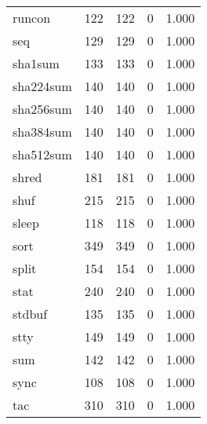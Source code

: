 \begin{longtable}{lp{4.5cm}p{4.5cm}p{4.5cm}p{4.5cm}}
runcon    &                     122 &              122 &                 0 &                        1.000 \\
seq       &                     129 &              129 &                 0 &                        1.000 \\
sha1sum   &                     133 &              133 &                 0 &                        1.000 \\
sha224sum &                     140 &              140 &                 0 &                        1.000 \\
sha256sum &                     140 &              140 &                 0 &                        1.000 \\
sha384sum &                     140 &              140 &                 0 &                        1.000 \\
sha512sum &                     140 &              140 &                 0 &                        1.000 \\
shred     &                     181 &              181 &                 0 &                        1.000 \\
shuf      &                     215 &              215 &                 0 &                        1.000 \\
sleep     &                     118 &              118 &                 0 &                        1.000 \\
sort      &                     349 &              349 &                 0 &                        1.000 \\
split     &                     154 &              154 &                 0 &                        1.000 \\
stat      &                     240 &              240 &                 0 &                        1.000 \\
stdbuf    &                     135 &              135 &                 0 &                        1.000 \\
stty      &                     149 &              149 &                 0 &                        1.000 \\
sum       &                     142 &              142 &                 0 &                        1.000 \\
sync      &                     108 &              108 &                 0 &                        1.000 \\
tac       &                     310 &              310 &                 0 &                        1.000 \\

\end{longtable}
